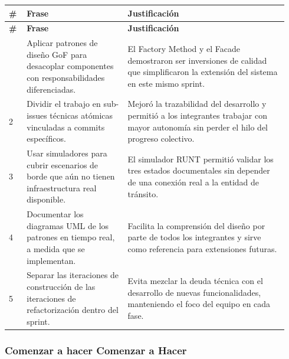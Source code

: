 \documentclass[11pt,a4paper]{article}
\begin{document}
\begingroup
\scriptsize
\setlength{\tabcolsep}{3pt}
\begin{longtable}{P{0.06\linewidth}P{0.34\linewidth}P{0.54\linewidth}}
\toprule
\textbf{\#} & \textbf{Frase} & \textbf{Justificación} \\
\midrule
\endfirsthead
\toprule
\textbf{\#} & \textbf{Frase} & \textbf{Justificación} \\
\midrule
\endhead
\bottomrule
{} & Aplicar patrones de diseño GoF para desacoplar componentes con responsabilidades diferenciadas. & El Factory Method y el Facade demostraron ser inversiones de calidad que simplificaron la extensión del sistema en este mismo sprint. \\
2 & Dividir el trabajo en sub-issues técnicas atómicas vinculadas a commits específicos. & Mejoró la trazabilidad del desarrollo y permitió a los integrantes trabajar con mayor autonomía sin perder el hilo del progreso colectivo. \\
3 & Usar simuladores para cubrir escenarios de borde que aún no tienen infraestructura real disponible. & El simulador RUNT permitió validar los tres estados documentales sin depender de una conexión real a la entidad de tránsito. \\
4 & Documentar los diagramas UML de los patrones en tiempo real, a medida que se implementan. & Facilita la comprensión del diseño por parte de todos los integrantes y sirve como referencia para extensiones futuras. \\
5 & Separar las iteraciones de construcción de las iteraciones de refactorización dentro del sprint. & Evita mezclar la deuda técnica con el desarrollo de nuevas funcionalidades, manteniendo el foco del equipo en cada fase. \\
\end{longtable}
\endgroup

\subsubsection{Comenzar a hacer Comenzar a Hacer}
\end{document}
